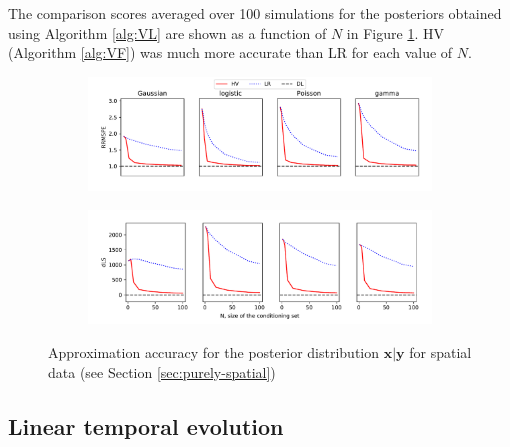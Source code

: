 \documentclass[12pt,letterpaper]{article}
\theoremstyle{propstyle}
\theoremstyle{propstyle}
\theoremstyle{propstyle}
\theoremstyle{propstyle}
\theoremstyle{propstyle}
\newcommand{\bx}{\mathbf{x}}
\newcommand{\by}{\mathbf{y}}
\begin{document}
The comparison scores averaged over 100 simulations for the posteriors obtained using Algorithm \ref{alg:VL} are shown as a function of $N$ in Figure \ref{fig:spatial-scores}. HV (Algorithm \ref{alg:VF}) was much more accurate than LR for each value of $N$.

\begin{figure}[ht]
    \centering
    \begin{subfigure}{1.0\textwidth}
        \includegraphics[trim=0mm 6mm 0mm 0mm, clip,width=1.0\textwidth]{plots/spatial-RRMSPE.pdf}
    \end{subfigure}
    \medskip
    \begin{subfigure}{1.0\textwidth}
        \includegraphics[trim=0mm 0mm 0mm 6mm, clip,width=1.0\textwidth]{plots/spatial-dLS.pdf}
    \end{subfigure}
    \caption{Approximation accuracy for the posterior distribution $\bx|\by$ for spatial data (see Section \ref{sec:purely-spatial})}
    \label{fig:spatial-scores}
\end{figure}




\subsection{Linear temporal evolution\label{sec:simul-linear}}
\end{document}

